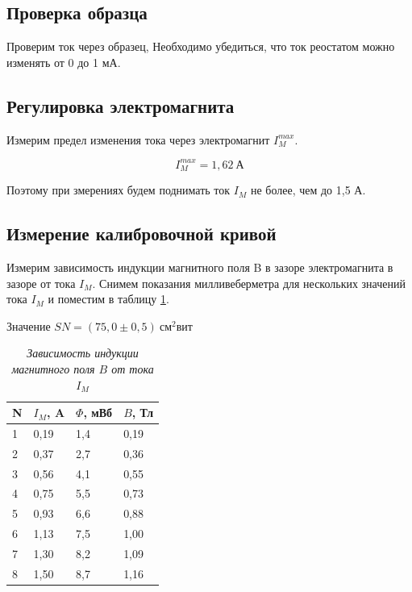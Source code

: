 \documentclass[a4paper,12pt]{article}
\begin{document}
\subsection{Проверка образца}

Проверим ток через образец, Необходимо убедиться, что ток реостатом можно изменять от 0 до 1 мА.

\subsection{Регулировка электромагнита}

Измерим предел изменения тока через электромагнит $I_M^{max}$.

\begin{equation*}
    I_M^{max} = 1,62 \ \text{А}
\end{equation*}

Поэтому при змерениях будем поднимать ток $I_M$ не более, чем до 1,5 А.

\subsection{Измерение калибровочной кривой}

Измерим зависимость индукции магнитного поля B в зазоре электромагнита в зазоре от тока $I_M$.
Снимем показания милливеберметра для нескольких значений тока $I_M$ и поместим в таблицу \ref{table:1}.

Значение $SN = (75,0 \pm 0,5) \ \text{см}^2 \text{вит}$ 

\begin{table}[!ht]
    \centering
    \begin{tabular}{|l|l|l|l|}
    \hline
        N & $I_M$, A & $\Phi$, мВб & $B$, Тл \\ \hline
        1 & 0,19 & 1,4 & 0,19 \\ \hline
        2 & 0,37 & 2,7 & 0,36 \\ \hline
        3 & 0,56 & 4,1 & 0,55 \\ \hline
        4 & 0,75 & 5,5 & 0,73 \\ \hline
        5 & 0,93 & 6,6 & 0,88 \\ \hline
        6 & 1,13 & 7,5 & 1,00 \\ \hline
        7 & 1,30 & 8,2 & 1,09 \\ \hline
        8 & 1,50 & 8,7 & 1,16 \\ \hline
    \end{tabular}\caption{\textit{Зависимость индукции магнитного поля $B$ от тока $I_M$}}\label{table:1}
\end{table}
\end{document}
